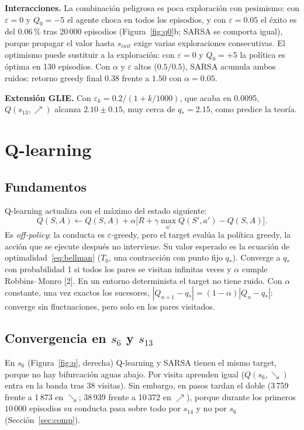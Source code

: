 \documentclass[11pt,a4paper]{article}
\newcommand{\UR}{{\nearrow}}
\newcommand{\DR}{{\searrow}}
\begin{document}
\textbf{Interacciones.} La combinación peligrosa es poca exploración con pesimismo: con $\varepsilon=0$ y $Q_0=-5$ el agente choca en todos los episodios, y con $\varepsilon=0.05$ el éxito es del 0.06\,\% tras 20\,000 episodios (Figura~\ref{fig:q0}b; SARSA se comporta igual), porque propagar el valor hasta $s_{init}$ exige varias exploraciones consecutivas. El optimismo puede sustituir a la exploración: con $\varepsilon=0$ y $Q_0=+5$ la política es óptima en 130 episodios. Con $\alpha$ y $\varepsilon$ altos ($0.5/0.5$), SARSA acumula ambos ruidos: retorno greedy final $0.38$ frente a $1.50$ con $\alpha=0.05$.

\textbf{Extensión GLIE.} Con $\varepsilon_k=0.2/(1+k/1000)$, que acaba en 0.0095, $Q(s_{13},\UR)$ alcanza $2.10\pm0.15$, muy cerca de $q_*=2.15$, como predice la teoría.

\section{Q-learning}
\subsection{Fundamentos}

Q-learning actualiza con el máximo del estado siguiente:
\begin{equation}
Q(S,A)\leftarrow Q(S,A)+\alpha\big[R+\gamma\max_{a'}Q(S',a')-Q(S,A)\big].
\end{equation}
Es \emph{off-policy}: la conducta es $\varepsilon$-greedy, pero el target evalúa la política greedy, la acción que se ejecute después no interviene. Su valor esperado es la ecuación de optimalidad~\eqref{eq:bellman} ($T_0$, una contracción con punto fijo $q_*$). Converge a $q_*$ con probabilidad 1 si todos los pares se visitan infinitas veces y $\alpha$ cumple Robbins--Monro [2]. En un entorno determinista el target no tiene ruido. Con $\alpha$ constante, una vez exactos los sucesores, $|Q_{n+1}-q_*|=(1-\alpha)|Q_n-q_*|$: converge sin fluctuaciones, pero solo en los pares visitados.

\subsection{Convergencia en \texorpdfstring{$s_6$}{s6} y \texorpdfstring{$s_{13}$}{s13}}

En $s_6$ (Figura~\ref{fig:q}, derecha) Q-learning y SARSA tienen el mismo target, porque no hay bifurcación aguas abajo. Por visita aprenden igual ($Q(s_6,\DR)$ entra en la banda tras 38 visitas). Sin embargo, en pasos tardan el doble (3\,759 frente a 1\,873 en $\DR$; 38\,939 frente a 10\,372 en $\UR$), porque durante los primeros $10\,000$ episodios su conducta pasa sobre todo por $s_{14}$ y no por $s_6$ (Sección~\ref{sec:comp}).
\end{document}
